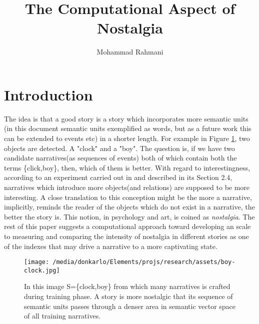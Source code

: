 \documentclass{article}
\begin{document}
	
	\title{The Computational Aspect of Nostalgia}
	\author{Mohammad Rahmani}
	\date{}
	\maketitle
	\section{Introduction}\label{sec:introduction}
	The idea is that a good story is a story which incorporates more semantic units (in this document semantic units exemplified as words, but as a future work this can be extended to events etc) in a shorter length. For example in Figure \ref{fig:boy-clock}, two objects are detected. A "clock" and a "boy". The question is, if we have two candidate narratives(as sequences of events) both of which contain both the terms \{click,boy\}, then, which of them is better. With regard to interestingness, according to an experiment carried out in \citet{mcintyre-2009-learning-to-tell-tales-a-data-driven-approach-to-story-generation} and described in its Section 2.4, narratives which introduce more objects(and relations) are supposed to be more interesting. A close translation to this conception might be the more a narrative, implicitly, reminds the reader of the objects which do not exist in a narrative, the better the story is. This notion, in psychology and art, is coined as \textit{nostalgia}. The rest of this paper suggests a computational approach toward developing an scale to measuring and comparing the intensity of nostalgia in different stories as one of the indexes that may drive a narrative to a more captivating state.  
	\begin{figure}[h!]
		\centering
		\texttt{[image: /media/donkarlo/Elements/projs/research/assets/boy-clock.jpg]}
		\caption{In this image S=\{clock,boy\} from which many narratives is crafted during training phase. A story is more nostalgic that its sequence of semantic units passes through a denser area in semantic vector space of all training narratives.} 
		\label{fig:boy-clock}
	\end{figure}
\end{document}
